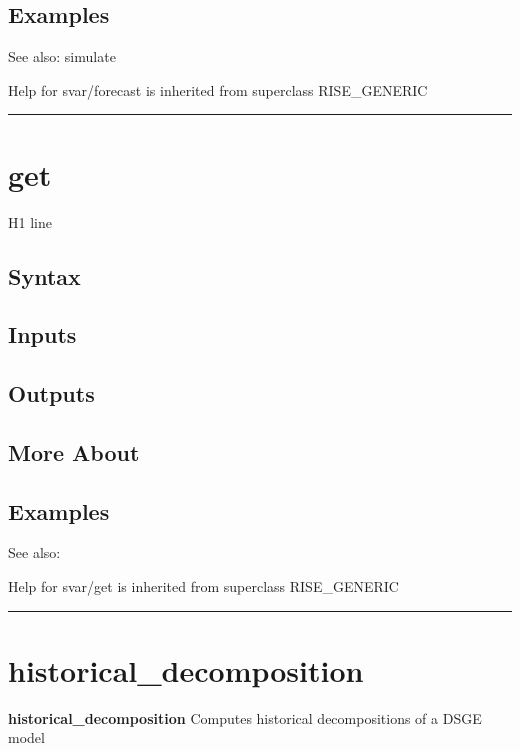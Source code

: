 \documentclass[letterpaper,10pt,english]{sphinxmanual}
\begin{document}
\subsection{Examples}
\label{classes/models/@svar/svar:id19}
See also: simulate

Help for svar/forecast is inherited from superclass RISE\_GENERIC


\bigskip\hrule{}\bigskip



\section{get}
\label{classes/models/@svar/svar:id20}\label{classes/models/@svar/svar:get}
H1 line


\subsection{Syntax}
\label{classes/models/@svar/svar:id21}

\subsection{Inputs}
\label{classes/models/@svar/svar:id22}

\subsection{Outputs}
\label{classes/models/@svar/svar:id23}

\subsection{More About}
\label{classes/models/@svar/svar:id24}

\subsection{Examples}
\label{classes/models/@svar/svar:id25}
See also:

Help for svar/get is inherited from superclass RISE\_GENERIC


\bigskip\hrule{}\bigskip



\section{historical\_decomposition}
\label{classes/models/@svar/svar:historical-decomposition}\label{classes/models/@svar/svar:id26}
\textbf{historical\_decomposition} Computes historical decompositions of a DSGE model
\end{document}
